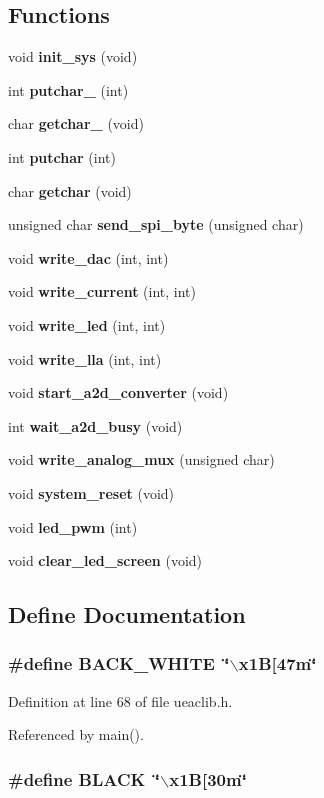 \subsection*{Functions}
\begin{CompactItemize}
\item 
void {\bf init\_\-sys} (void)
\item 
int {\bf putchar\_} (int)
\item 
char {\bf getchar\_} (void)
\item 
int {\bf putchar} (int)
\item 
char {\bf getchar} (void)
\item 
unsigned char {\bf send\_\-spi\_\-byte} (unsigned char)
\item 
void {\bf write\_\-dac} (int, int)
\item 
void {\bf write\_\-current} (int, int)
\item 
void {\bf write\_\-led} (int, int)
\item 
void {\bf write\_\-lla} (int, int)
\item 
void {\bf start\_\-a2d\_\-converter} (void)
\item 
int {\bf wait\_\-a2d\_\-busy} (void)
\item 
void {\bf write\_\-analog\_\-mux} (unsigned char)
\item 
void {\bf system\_\-reset} (void)
\item 
void {\bf led\_\-pwm} (int)
\item 
void {\bf clear\_\-led\_\-screen} (void)
\end{CompactItemize}


\subsection{Define Documentation}
\subsubsection{\setlength{\rightskip}{0pt plus 5cm}\#define BACK\_\-WHITE~\char`\"{}$\backslash$x1B[47m\char`\"{}}\label{ueaclib_8h_a3}




Definition at line 68 of file ueaclib.h.

Referenced by main().
\subsubsection{\setlength{\rightskip}{0pt plus 5cm}\#define BLACK~\char`\"{}$\backslash$x1B[30m\char`\"{}}\label{ueaclib_8h_a0}




